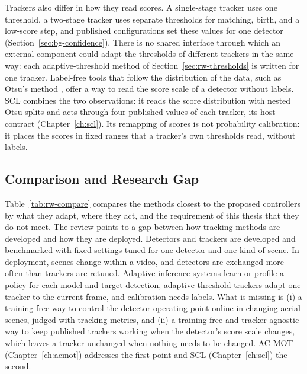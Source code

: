 Trackers also differ in how they read scores. A single-stage tracker uses one threshold, a two-stage tracker uses separate thresholds for matching, birth, and a low-score step, and published configurations set these values for one detector (Section~\ref{sec:bg-confidence}). There is no shared interface through which an external component could adapt the thresholds of different trackers in the same way: each adaptive-threshold method of Section~\ref{sec:rw-thresholds} is written for one tracker. Label-free tools that follow the distribution of the data, such as Otsu's method \cite{goh2018otsu}, offer a way to read the score scale of a detector without labels. SCL combines the two observations: it reads the score distribution with nested Otsu splits and acts through four published values of each tracker, its host contract (Chapter~\ref{ch:scl}). Its remapping of scores is not probability calibration: it places the scores in fixed ranges that a tracker's own thresholds read, without labels.

\subsection{Comparison and Research Gap}\label{sec:rw-gap}
Table~\ref{tab:rw-compare} compares the methods closest to the proposed controllers by what they adapt, where they act, and the requirement of this thesis that they do not meet. The review points to a gap between how tracking methods are developed and how they are deployed. Detectors and trackers are developed and benchmarked with fixed settings tuned for one detector and one kind of scene. In deployment, scenes change within a video, and detectors are exchanged more often than trackers are retuned. Adaptive inference systems learn or profile a policy for each model and target detection, adaptive-threshold trackers adapt one tracker to the current frame, and calibration needs labels. What is missing is (i) a training-free way to control the detector operating point online in changing aerial scenes, judged with tracking metrics, and (ii) a training-free and tracker-agnostic way to keep published trackers working when the detector's score scale changes, which leaves a tracker unchanged when nothing needs to be changed. AC-MOT (Chapter~\ref{ch:acmot}) addresses the first point and SCL (Chapter~\ref{ch:scl}) the second.

